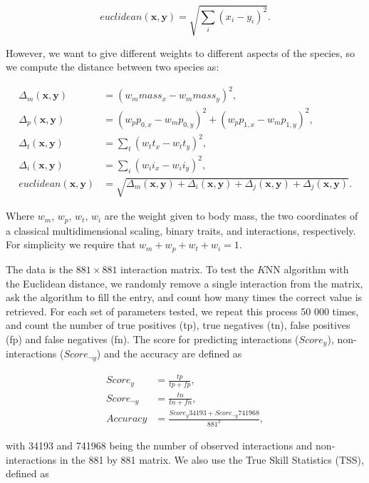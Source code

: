 \documentclass[letterpaper]{article}
\begin{document}
\begin{equation}
  euclidean(\mathbf{x}, \mathbf{y}) = \sqrt{\sum_i (x_i - y_i)^2}.
\end{equation}

However, we want to give different weights to different aspects of the species,
so we compute the distance between two species as:

\begin{align}
  \Delta_m(\mathbf{x}, \mathbf{y}) &= (w_mmass_x - w_mmass_y)^2,\\
  \Delta_p(\mathbf{x}, \mathbf{y}) &= (w_pp_{0,x} - w_mp_{0,y})^2 + (w_pp_{1,x} - w_mp_{1,y})^2,\\
  \Delta_t(\mathbf{x}, \mathbf{y}) &= \sum_t (w_tt_x - w_tt_y)^2,\\
  \Delta_i(\mathbf{x}, \mathbf{y}) &= \sum_i (w_ii_x - w_ii_y)^2,\\
  euclidean(\mathbf{x}, \mathbf{y}) &= \sqrt{\Delta_m(\mathbf{x}, \mathbf{y}) + \Delta_i(\mathbf{x}, \mathbf{y}) + \Delta_j(\mathbf{x}, \mathbf{y}) + \Delta_j(\mathbf{x}, \mathbf{y})}.
\end{align}

Where $w_m$, $w_p$, $w_t$, $w_i$ are the weight given to body mass, the two
coordinates of a classical multidimensional scaling, binary traits, and
interactions, respectively. For simplicity we require that $w_m + w_p + w_t +
w_i = 1$.

The data is the $881 \times 881$ interaction matrix. To test the $K$NN
algorithm with the Euclidean distance, we randomly remove a single interaction
from the matrix, ask the algorithm to fill the entry, and count how many times
the correct value is retrieved. For each set of parameters tested, we repeat
this process 50 000 times, and count the number of true positives (tp), true
negatives (tn), false positives (fp) and false negatives (fn). The score for
predicting interactions ($Score_y$), non-interactions ($Score_{\neg y}$) and
the accuracy are defined as

\begin{align}
  Score_y &= \frac{tp}{tp + fp},\\
  Score_{\neg y} &= \frac{tn}{tn + fn},\\
  Accuracy &= \frac{Score_y34193 + Score_{\neg y}741968}{881^2},
\end{align}

with 34193 and 741968 being the number of observed interactions and
non-interactions in the 881 by 881 matrix. We also use the True Skill
Statistics (TSS), defined as
\end{document}
